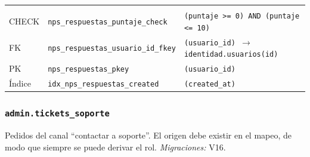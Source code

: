 {\small
\begin{xltabular}{\textwidth}{@{}>{\raggedright\arraybackslash}p{1.7cm} >{\raggedright\arraybackslash}p{4.6cm} L@{}}
    \toprule
     &  &  \\
    \midrule
    \endfirsthead
    \toprule
     &  &  \\
    \midrule
    \endhead
    \bottomrule
    \endfoot
    CHECK & \texttt{nps\_\allowbreak{}respuestas\_\allowbreak{}puntaje\_\allowbreak{}check} & \texttt{(\allowbreak{}puntaje \textgreater{}= 0) AND (\allowbreak{}puntaje \textless{}= 10)} \\
    FK & \texttt{nps\_\allowbreak{}respuestas\_\allowbreak{}usuario\_\allowbreak{}id\_\allowbreak{}fkey} & \texttt{(\allowbreak{}usuario\_\allowbreak{}id) $\rightarrow$ identidad.usuarios(\allowbreak{}id)} \\
    PK & \texttt{nps\_\allowbreak{}respuestas\_\allowbreak{}pkey} & \texttt{(\allowbreak{}usuario\_\allowbreak{}id)} \\
    Índice & \texttt{idx\_\allowbreak{}nps\_\allowbreak{}respuestas\_\allowbreak{}created} & \texttt{(\allowbreak{}created\_\allowbreak{}at)} \\
\end{xltabular}
}

\subsubsection{\texorpdfstring{\texttt{admin.tickets\_\allowbreak{}soporte}}{admin.tickets\_soporte}}\label{dd:admin.tickets_soporte}

Pedidos del canal ``contactar a soporte''. El origen debe existir en el mapeo, de modo que siempre se puede derivar el rol. \emph{Migraciones:} V16.

